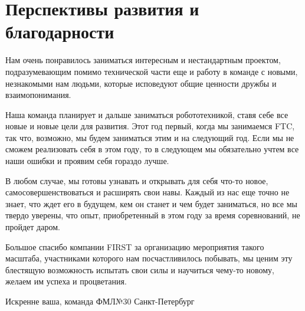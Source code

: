 
\section{Перспективы развития и благодарности}
    Нам очень понравилось заниматься интересным и нестандартным проектом, подразумевающим помимо технической части еще и работу в команде с новыми, незнакомыми нам людьми, которые исповедуют общие ценности дружбы и взаимопонимания.\newline
    
    Наша команда планирует и дальше заниматься робототехникой, ставя себе все новые и новые цели для развития. Этот год первый, когда мы занимаемся FTC, так что, возможно, мы будем заниматься этим и на следующий год. Если мы не сможем реализовать себя в этом году, то в следующем мы обязательно учтем все наши ошибки и проявим себя гораздо лучше.\newline
    
    В любом случае, мы готовы узнавать и открывать для себя что-то новое, самосовершенствоваться и расширять свои навы.
     Каждый из нас еще точно не знает, что ждет его в будущем, кем он станет и чем будет заниматься, но все мы твердо уверены, что опыт, приобретенный в этом году за время соревнований, не пройдет даром.\newline
    
    Большое спасибо компании FIRST за организацию мероприятия такого масштаба, участниками которого нам посчастливилось побывать, мы ценим эту блестящую возможность испытать свои силы и научиться чему-то новому, желаем им успеха и процветания.\newline
    
    \begin{center}
      Искренне ваша, команда ФМЛ№30 Санкт-Петербург
    \end{center}
\newpage

